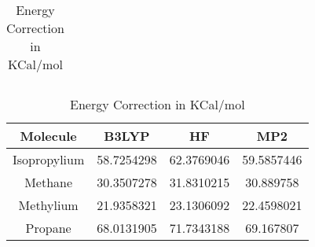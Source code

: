 \begin{table}[htbp]
\begin{subtable}[h]{\textwidth}
\begin{tabular}{|c|c|c|c|}
\end{tabular}
\caption{Vibrational Energy in KCal/mol}
\end{subtable}
\vspace{\fill}
\begin{subtable}[h]{\textwidth}
\vspace*{1 cm}
\centering
\begin{tabular}{|c|c|c|c|}
\hline
Molecule     & B3LYP      & HF         & MP2        \\ \hline
Isopropylium & 58.7254298 & 62.3769046 & 59.5857446 \\
Methane      & 30.3507278 & 31.8310215 & 30.889758  \\
Methylium    & 21.9358321 & 23.1306092 & 22.4598021 \\
Propane      & 68.0131905 & 71.7343188 & 69.167807  \\ \hline
\end{tabular}
\caption{Energy Correction in KCal/mol}
\end{subtable}
\end{table}
\clearpage